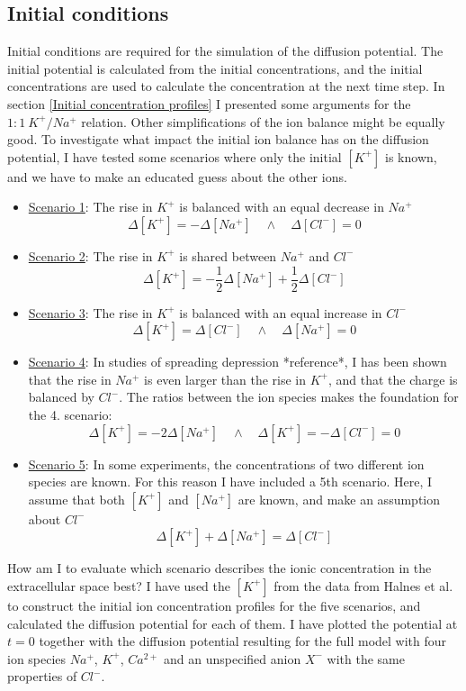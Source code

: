 \documentclass{article}
\begin{document}
\subsection{Initial conditions}\label{Scenarios}
Initial conditions are required for the simulation of the diffusion potential. The initial potential is calculated from the initial concentrations, and the initial concentrations are used to calculate the concentration at the next time step. In section \ref{Initial concentration profiles} I presented some arguments for the $1\!:\!1\ K^+\!/Na^+$ relation. Other simplifications of the ion balance might be equally good. To investigate what impact the initial ion balance has on the diffusion potential, I have tested some scenarios where only the initial $[K^+]$ is known, and we have to make an educated guess about the other ions.
\begin{itemize}
	\item[]\underline{Scenario 1}: The rise in $K^+$ is balanced with an equal decrease in $Na^+$
	  $$\Delta [K^+] = -\Delta [Na^+] \quad \land \quad \Delta [Cl^-] =0$$
	\item[]\underline{Scenario 2}:  The rise in $K^+$ is shared between $Na^+$ and $Cl^-$
	$$\Delta [K^+] = -\frac{1}{2} \Delta [Na^+] +\frac{1}{2} \Delta [Cl^-] $$ 
		\item[]\underline{Scenario 3}:  The rise in $K^+$ is balanced with an equal increase in $Cl^-$
	  $$\Delta [K^+] = \Delta [Cl^-] \quad \land \quad \Delta [Na^+] =0$$
	  \item[]\underline{Scenario 4}:  In studies of spreading depression *reference*, I has been shown that the rise in $Na^+$ is even larger than the rise in $K^+$, and that the charge is balanced by $Cl^-$. The ratios between the ion species makes the foundation for the 4. scenario:
	$$\Delta [K^+] = -2 \Delta [Na^+] \quad \land \quad \Delta [K^+] =  -\Delta [Cl^-] =0$$ 
	\item[]\underline{Scenario 5}: In some experiments, the concentrations of two different ion species are known. For this reason I have included a 5th scenario. Here, I assume that both $[K^+]$ and $[Na^+]$ are known, and make an assumption about $Cl^-$
	$$\Delta [K^+] + \Delta [Na^+] = \Delta[Cl^-] $$
\end{itemize}

How am I to evaluate which scenario describes the ionic concentration in the extracellular space best? I have used the $[K^+]$ from the data from Halnes et al.\cite{Halnes2016} to construct the initial ion concentration profiles for the five scenarios, and calculated the diffusion potential for each of them. I have plotted the potential at $t=0$ together with the diffusion potential resulting for the full model with four ion species $Na^+$, $K^+$, $Ca^{2+}$ and an unspecified anion $X^-$ with the same properties of $Cl^-$. 
\end{document}
